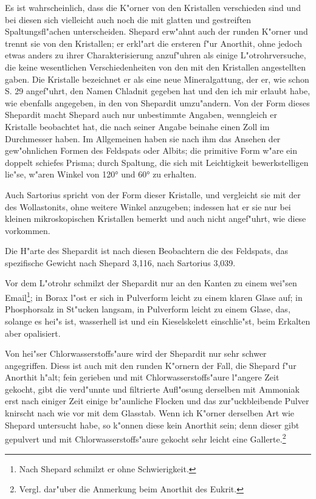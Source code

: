 \documentclass[a4paper, 11pt, oneside, german]{article}
\begin{document}
Es ist wahrscheinlich, dass die K"orner von den Kristallen verschieden sind und bei diesen sich vielleicht auch noch die mit glatten und gestreiften Spaltungsfl"achen unterscheiden. Shepard erw"ahnt auch der runden K"orner und trennt sie von den Kristallen; er erkl"art die ersteren f"ur Anorthit, ohne jedoch etwas anders zu ihrer Charakterisierung anzuf"uhren als einige L"otrohrversuche, die keine wesentlichen Verschiedenheiten von den mit den Kristallen angestellten gaben. Die Kristalle bezeichnet er als eine neue Mineralgattung, der er, wie schon S. 29 angef"uhrt, den Namen Chladnit gegeben hat und den ich mir erlaubt habe, wie ebenfalls angegeben, in den von Shepardit umzu"andern. Von der Form dieses Shepardit macht Shepard auch nur unbestimmte Angaben, wenngleich er Kristalle beobachtet hat, die nach seiner Angabe beinahe einen Zoll im Durchmesser haben. Im Allgemeinen haben sie nach ihm das Ansehen der gew"ohnlichen Formen des Feldspats oder Albits; die primitive Form w"are ein doppelt schiefes Prisma; durch Spaltung, die sich mit Leichtigkeit bewerkstelligen lie"se, w"aren Winkel von 120° und 60° zu erhalten.

Auch Sartorius spricht von der Form dieser Kristalle, und vergleicht sie mit der des Wollastonits, ohne weitere Winkel anzugeben; indessen hat er sie nur bei kleinen mikroskopischen Kristallen bemerkt und auch nicht angef"uhrt, wie diese vorkommen.

Die H"arte des Shepardit ist nach diesen Beobachtern die des Feldspats, das spezifische Gewicht nach Shepard 3,116, nach Sartorius 3,039.

Vor dem L"otrohr schmilzt der Shepardit nur an den Kanten zu einem wei"sen Email\footnote{Nach Shepard schmilzt er ohne Schwierigkeit.}; in Borax l"ost er sich in Pulverform leicht zu einem klaren Glase auf; in Phosphorsalz in St"ucken langsam, in Pulverform leicht zu einem Glase, das, solange es hei"s ist, wasserhell ist und ein Kieselskelett einschlie"st, beim Erkalten aber opalisiert.

Von hei"ser Chlorwasserstoffs"aure wird der Shepardit nur sehr schwer angegriffen. Diess ist auch mit den runden K"ornern der Fall, die Shepard f"ur Anorthit h"alt; fein gerieben und mit Chlorwasserstoffs"aure l"angere Zeit gekocht, gibt die verd"unnte und filtrierte Aufl"osung derselben mit Ammoniak erst nach einiger Zeit einige br"aunliche Flocken und das zur"uckbleibende Pulver knirscht nach wie vor mit dem Glasstab. Wenn ich K"orner derselben Art wie Shepard untersucht habe, so k"onnen diese kein Anorthit sein; denn dieser gibt gepulvert und mit Chlorwasserstoffs"aure gekocht sehr leicht eine Gallerte.\footnote{Vergl. dar"uber die Anmerkung beim Anorthit des Eukrit.}
\end{document}
